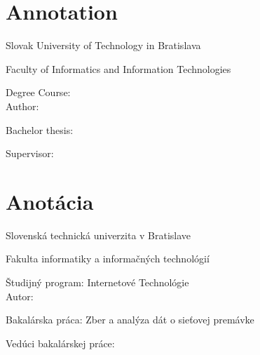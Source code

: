 
\thispagestyle{empty}

\section*{Annotation}

\begin{minipage}[t]{1\columnwidth}%
Slovak University of Technology in Bratislava 

Faculty of Informatics and Information Technologies

Degree Course: \myStudyProgram\\

Author: \myName

Bachelor thesis: \myTitle

Supervisor: \mySupervisor

\myDate%
\end{minipage}

\bigskip{}

\lipsum[3]


\newpage{}\thispagestyle{empty}

\newpage
\thispagestyle{empty}
\mbox{}
\newpage

\thispagestyle{empty}
\section*{Anotácia}

\begin{minipage}[t]{1\columnwidth}%
Slovenská technická univerzita v Bratislave

Fakulta informatiky a informačných technológií

Študijný program: Internetové Technológie\\

Autor: \myName

Bakalárska práca: Zber a analýza dát o sieťovej premávke

Vedúci bakalárskej práce: \mySupervisor

\myDate%
\end{minipage}

\bigskip{}

\lipsum[3]


\newpage{}\thispagestyle{empty}\medskip{}


\newpage{}

\newpage
\thispagestyle{empty}
\mbox{}
\newpage




